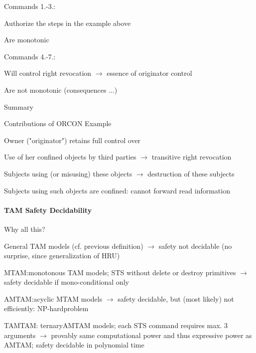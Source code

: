 \documentclass[a4paper]{article}
\begin{document}
\begin{multicols}{3}
    \begin{itemize*}
        \item Commands 1.-3.:
        \begin{itemize*}
            \item Authorize the steps in the example above
            \item Are monotonic
        \end{itemize*}
        \item Commands 4.-7.:
        \begin{itemize*}
            \item Will control right revocation $\rightarrow$  essence of originator control
            \item Are not monotonic (consequences ...)
        \end{itemize*}
        \item Summary
        \begin{itemize*}
            \item Contributions of ORCON Example
            \item Owner ("originator") retains full control over
            \item Use of her confined objects by third parties $\rightarrow$ transitive right revocation
            \item Subjects using (or misusing) these objects $\rightarrow$ destruction of these subjects
            \item Subjects using such objects are confined: cannot forward read information
        \end{itemize*}
    \end{itemize*}

    \paragraph{TAM Safety Decidability}
    Why all this?
    \begin{itemize*}
        \item General TAM models (cf. previous definition) $\rightarrow$  safety not decidable (no surprise, since generalization of HRU)
        \item MTAM:monotonous TAM models; STS without delete or destroy primitives $\rightarrow$  safety decidable if mono-conditional only
        \item AMTAM:acyclic MTAM models $\rightarrow$ safety decidable, but (most likely) not efficiently: NP-hardproblem
        \item TAMTAM: ternaryAMTAM models; each STS command requires max. 3 arguments $\rightarrow$  provably same computational power and thus expressive power as AMTAM; safety decidable in polynomial time
    \end{itemize*}


\end{multicols}
\end{document}
